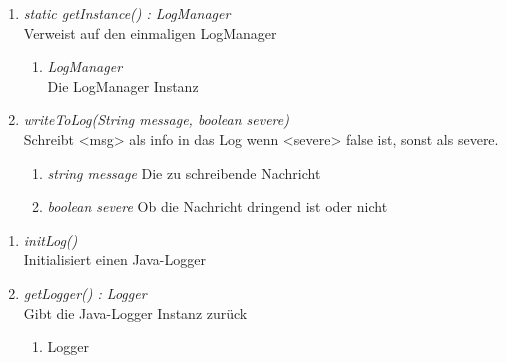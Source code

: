 \begin{enumerate}[+]

	\item \textit{static getInstance() : LogManager}  \\ Verweist auf den einmaligen LogManager
	
	\vspace{-0.2cm}
	\begin{enumerate}[$\circ$]
		\item \textit{LogManager} \\ Die LogManager Instanz
	\end{enumerate}

\item \textit{writeToLog(String message, boolean severe)} \\ Schreibt <msg> als info in das Log wenn <severe> false ist,
sonst als severe.
\begin{enumerate}[$\bullet$]
\item \textit{string message} Die zu schreibende Nachricht
\item \textit{boolean severe} Ob die Nachricht dringend ist oder nicht
\end{enumerate}
\end{enumerate}


\begin{enumerate}[$-$]

\item \textit{initLog()} \\ Initialisiert einen Java-Logger
\vspace{-0.2cm}

\item \textit{getLogger() : Logger} \\ Gibt die Java-Logger Instanz zurück
\begin{enumerate}[$\circ$]
	\item Logger
\end{enumerate}
\end{enumerate}
	